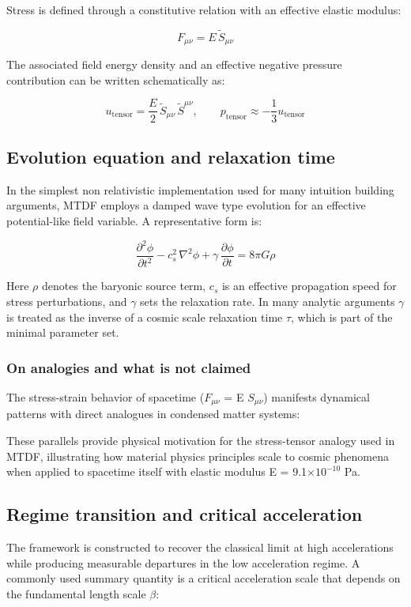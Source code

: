 \documentclass[11pt,a4paper]{article}
\begin{document}
Stress is defined through a constitutive relation with an effective elastic modulus:

\[
F_{\mu\nu} = E\,\tilde{S}_{\mu\nu}
\]

The associated field energy density and an effective negative pressure contribution can be written schematically as:

\[
u_\mathrm{tensor} = \frac{E}{2}\,\tilde{S}_{\mu\nu}\,\tilde{S}^{\mu\nu},\qquad
p_\mathrm{tensor} \approx -\frac{1}{3}u_\mathrm{tensor}
\]

\subsection{Evolution equation and relaxation time}
In the simplest non relativistic implementation used for many intuition building arguments, MTDF employs a damped wave type evolution for an effective potential-like field variable. A representative form is:

\[
\frac{\partial^2 \phi}{\partial t^2} - c_s^2\,\nabla^2\phi + \gamma\,\frac{\partial \phi}{\partial t} = 8\pi G\rho
\]

Here \(\rho\) denotes the baryonic source term, \(c_s\) is an effective propagation speed for stress perturbations, and \(\gamma\) sets the relaxation rate. In many analytic arguments \(\gamma\) is treated as the inverse of a cosmic scale relaxation time \(\tau\), which is part of the minimal parameter set.

\begin{mdframed}[linecolor=accent,linewidth=0.5pt,backgroundcolor=callout-bg,leftline=true,rightline=true,topline=true,bottomline=true,innerleftmargin=8pt,innerrightmargin=8pt,innertopmargin=6pt,innerbottommargin=6pt]
\subsubsection{On analogies and what is not claimed}
The stress-strain behavior of spacetime ($F_{\mu\nu}$ = E $S_{\mu\nu}$) manifests dynamical patterns with direct analogues in condensed matter systems:

These parallels provide physical motivation for the stress-tensor analogy used in MTDF, illustrating how material physics principles scale to cosmic phenomena when applied to spacetime itself with elastic modulus E = 9.1$\times$$10^{-10}$ Pa.
\end{mdframed}

\subsection{Regime transition and critical acceleration}
The framework is constructed to recover the classical limit at high accelerations while producing measurable departures in the low acceleration regime. A commonly used summary quantity is a critical acceleration scale that depends on the fundamental length scale \(\beta\):
\end{document}
